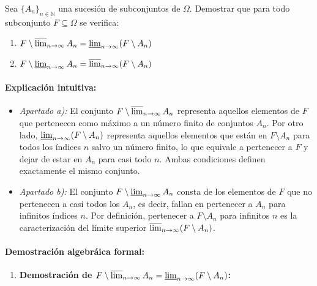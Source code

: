 \begin{problema}
Sea $\{A_n\}_{n \in \mathbb{N}}$ una sucesión de subconjuntos de $\Omega$. Demostrar que para todo subconjunto $F \subseteq \Omega$ se verifica:
\begin{enumerate}[label=\alph*)]
    \item $F \setminus \varlimsup_{n \to \infty} A_n = \varliminf_{n \to \infty} (F \setminus A_n)$
    \item $F \setminus \varliminf_{n \to \infty} A_n = \varlimsup_{n \to \infty} (F \setminus A_n)$
\end{enumerate}

\tcblower

\paragraph{Explicación intuitiva:}
\begin{itemize}
    \item \textit{Apartado a):} El conjunto $F \setminus \varlimsup_{n \to \infty} A_n$ representa aquellos elementos de $F$ que pertenecen como máximo a un número finito de conjuntos $A_n$. Por otro lado, $\varliminf_{n \to \infty} (F \setminus A_n)$ representa aquellos elementos que están en $F \setminus A_n$ para todos los índices $n$ salvo un número finito, lo que equivale a pertenecer a $F$ y dejar de estar en $A_n$ para casi todo $n$. Ambas condiciones definen exactamente el mismo conjunto.
    
    \item \textit{Apartado b):} El conjunto $F \setminus \varliminf_{n \to \infty} A_n$ consta de los elementos de $F$ que no pertenecen a casi todos los $A_n$, es decir, fallan en pertenecer a $A_n$ para infinitos índices $n$. Por definición, pertenecer a $F \setminus A_n$ para infinitos $n$ es la caracterización del límite superior $\varlimsup_{n \to \infty} (F \setminus A_n)$.
\end{itemize}

\paragraph{Demostración algebráica formal:}

\begin{enumerate}[label=\alph*)]
    \item \textbf{Demostración de $F \setminus \varlimsup_{n \to \infty} A_n = \varliminf_{n \to \infty} (F \setminus A_n)$:}


\end{enumerate}
\end{problema}
